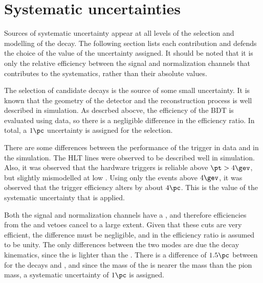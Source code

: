 \section{Systematic uncertainties}
\label{sec:dsphi:syst}

Sources of systematic uncertainty appear at all levels of the selection and modelling of the decay.
The following section lists each contribution and defends the choice of the value of the
uncertainty assigned.
It should be noted that it is only the relative efficiency between the signal and normalization
channels that contributes to the systematics, rather than their absolute values.

The selection of candidate \btodsphi decays is the source of some small uncertainty.
It is known that the geometry of the detector and the reconstruction process is well described in
simulation.
As descrbed abocve, the efficiency of the BDT is evaluated using data, so there is a negligible
difference in the efficiency ratio.
In total, a $1\pc$ uncertainty is assigned for the selection.

There are some differences between the performance of the trigger in data and in the simulation.
The HLT lines were observed to be described well in simulation.
Also, it was observed that the \lone hardware triggers is reliable above $\pt>4\gev$, but slightly
mismodelled at low \pt.
Using only the events above $4\gev$, it was observed that the trigger efficiency alters by about
$4\pc$.
This is the value of the systematic uncertainty that is applied.

Both the signal and normalization channels have a \Ds, and therefore efficiencies from the \Dp and
\Lc vetoes cancel to a large extent.
Given that these cuts are very efficient, the difference must be negligible, and in
 the efficiency ratio is assumed to be unity.
The only differences between the two modes are due the decay kinematics, since the \phii is lighter
than the \Dz.
There is a difference of $1.5\pc$ between  for the decays \bstodspi and \btodsd, and
since the mass of the \phii is nearer the \Dz mass than the pion mass, a systematic uncertainty of
$1\pc$ is assigned.


